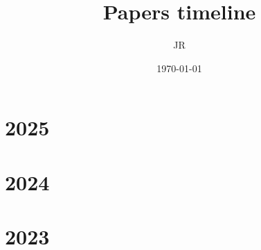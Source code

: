 \documentclass[10pt]{article}
\begin{document}
\title{\Large Papers timeline}
\author{JR}
\date{\today}

\maketitle

\tableofcontents

\newpage
\section{2025}
\begin{tcolorbox} [colback=blue!5!white,colframe=blue!75!black]
\begin{refsection}
    \nocite{deepseek-ai_deepseek-r1_2025}
    \printbibliography[heading=none]
\end{refsection}
\end{tcolorbox}

\newpage
\section{2024}
\begin{tcolorbox} [colback=blue!5!white,colframe=blue!75!black]
\begin{refsection}
    \nocite{qwen_qwen25_2025}
    \nocite{muennighoff_olmoe_2025}
    \nocite{penedo_fineweb_2024}
    \nocite{grattafiori2024llama3herdmodels}
    \nocite{gu_mamba_2024}
    \nocite{groeneveld_olmo_2024}
    \nocite{deepseek-ai_deepseek-v2_2024}
    \printbibliography[heading=none]
\end{refsection}
\end{tcolorbox}

\newpage
\section{2023}
\begin{tcolorbox} [colback=blue!5!white,colframe=blue!75!black]
\begin{refsection}
    \nocite{gu_mamba_2024}
    \nocite{jiang_mistral_2023}
    \nocite{touvron_llama_2023}
    \nocite{sun_principle-driven_2023}
    \nocite{anil_palm_2023}
    \nocite{peng_rwkv_2023}
    \nocite{rafailov_direct_2024}
    \nocite{yao_tree_2023}
    \nocite{noauthor_230401373_nodate}
    \nocite{liu_visual_2023}
    \nocite{longpre_flan_2023}
    \nocite{touvron2023llamaopenefficientfoundation}
    \nocite{huang_language_2023}
    \nocite{orvieto2023resurrectingrecurrentneuralnetworks}
    \nocite{noauthor_palm-e_nodate}
    \nocite{noauthor_gpt-4_2024}
    \nocite{longpre_flan_2023}
    \nocite{touvron2023llamaopenefficientfoundation}
    \printbibliography[heading=none]
\end{refsection}
\end{tcolorbox}
\end{document}
